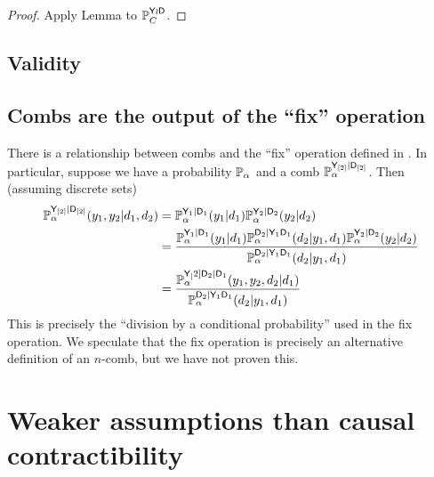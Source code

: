 \begin{proof}
Apply Lemma  to $\mathbb{P}_C^{\mathsf{Y}\wr \mathsf{D}}$.
\end{proof}

\subsection{Validity}

\subsection{Combs are the output of the ``fix'' operation}

There is a relationship between combs and the ``fix'' operation defined in \citet{richardson_nested_2017}. In particular, suppose we have a probability $\mathbb{P}_\alpha$ and a comb $\mathbb{P}_\alpha^{\mathsf{Y}_{[2]}|\mathsf{D}_{[2]}}$. Then (assuming discrete sets)
\begin{align}
    \mathbb{P}_\alpha^{\mathsf{Y}_{[2]}|\mathsf{D}_{[2]}}(y_1,y_2|d_1,d_2) &= \mathbb{P}_\alpha^{\mathsf{Y}_1|\mathsf{D}_1}(y_1|d_1)\mathbb{P}_\alpha^{\mathsf{Y}_2|\mathsf{D}_2}(y_2|d_2)\\
    &= \frac{\mathbb{P}_\alpha^{\mathsf{Y}_1|\mathsf{D}_1}(y_1|d_1)\mathbb{P}_\alpha^{\mathsf{D}_2|\mathsf{Y}_1\mathsf{D}_1}(d_2|y_1,d_1)\mathbb{P}_\alpha^{\mathsf{Y}_2|\mathsf{D}_2}(y_2|d_2)}{\mathbb{P}_\alpha^{\mathsf{D}_2|\mathsf{Y}_1\mathsf{D}_1}(d_2|y_1,d_1)}\\
    &= \frac{\mathbb{P}_\alpha^{\mathsf{Y}_[2]\mathsf{D}_2|\mathsf{D}_1}(y_1,y_2,d_2|d_1)}{\mathbb{P}_\alpha^{\mathsf{D}_2|\mathsf{Y}_1\mathsf{D}_1}(d_2|y_1,d_1)}
\end{align}
This is precisely the ``division by a conditional probability'' used in the fix operation. We speculate that the fix operation is precisely an alternative definition of an $n$-comb, but we have not proven this.


\section{Weaker assumptions than causal contractibility}

